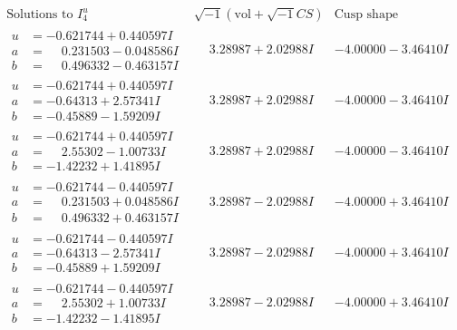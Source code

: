 \documentclass[1p]{elsarticle_modified}
\theoremstyle{definition}
\newcommand{\I}{\sqrt{-1}}
\begin{document}
$$\begin{array}{c|c|c}  
\text{Solutions to }I^u_{4}& \I (\text{vol} + \sqrt{-1}CS) & \text{Cusp shape}\\
 \hline 
\begin{aligned}
u &= -0.621744 + 0.440597 I \\
a &= \phantom{-}0.231503 - 0.048586 I \\
b &= \phantom{-}0.496332 - 0.463157 I\end{aligned}
 & \phantom{-}3.28987 + 2.02988 I & -4.00000 - 3.46410 I \\ \hline\begin{aligned}
u &= -0.621744 + 0.440597 I \\
a &= -0.64313 + 2.57341 I \\
b &= -0.45889 - 1.59209 I\end{aligned}
 & \phantom{-}3.28987 + 2.02988 I & -4.00000 - 3.46410 I \\ \hline\begin{aligned}
u &= -0.621744 + 0.440597 I \\
a &= \phantom{-}2.55302 - 1.00733 I \\
b &= -1.42232 + 1.41895 I\end{aligned}
 & \phantom{-}3.28987 + 2.02988 I & -4.00000 - 3.46410 I \\ \hline\begin{aligned}
u &= -0.621744 - 0.440597 I \\
a &= \phantom{-}0.231503 + 0.048586 I \\
b &= \phantom{-}0.496332 + 0.463157 I\end{aligned}
 & \phantom{-}3.28987 - 2.02988 I & -4.00000 + 3.46410 I \\ \hline\begin{aligned}
u &= -0.621744 - 0.440597 I \\
a &= -0.64313 - 2.57341 I \\
b &= -0.45889 + 1.59209 I\end{aligned}
 & \phantom{-}3.28987 - 2.02988 I & -4.00000 + 3.46410 I \\ \hline\begin{aligned}
u &= -0.621744 - 0.440597 I \\
a &= \phantom{-}2.55302 + 1.00733 I \\
b &= -1.42232 - 1.41895 I\end{aligned}
 & \phantom{-}3.28987 - 2.02988 I & -4.00000 + 3.46410 I \\ \hline\begin{aligned}

\end{aligned}
\end{array}$$
\end{document}
